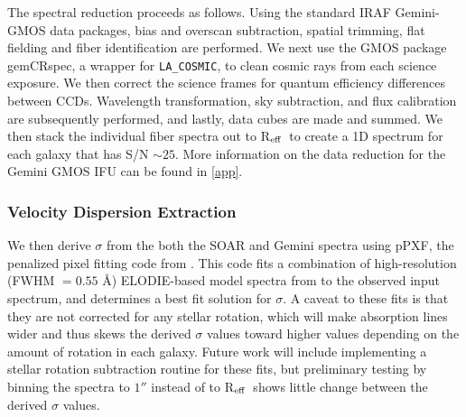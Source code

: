 \documentclass[iop,apj]{emulateapj}
\newcommand{\Reff}{R$_{\rm eff}$}
\begin{document}
The spectral reduction proceeds as follows. Using the standard IRAF Gemini-GMOS data packages, bias and overscan subtraction, spatial trimming, flat fielding and fiber identification are performed. We next use the GMOS package gemCRspec, a wrapper for \texttt{LA\_COSMIC}, to clean cosmic rays from each science exposure. We then correct the science frames for quantum efficiency differences between CCDs. Wavelength transformation, sky subtraction, and flux calibration are subsequently performed, and lastly, data cubes are made and summed. We then stack the individual fiber spectra out to \Reff\ to create a 1D spectrum for each galaxy that has S/N $\sim25$. More information on the data reduction for the Gemini GMOS IFU can be found in \autoref{app}.

\subsubsection{Velocity Dispersion Extraction}

\noindent We then derive $\sigma$ from the both the SOAR and Gemini spectra using {\sc pPXF}, the penalized pixel fitting code from \citet{Cappellari2004}. This code fits a combination of high-resolution (FWHM $= 0.55$ \AA) ELODIE-based model spectra from \citet{Maraston2011} to the observed input spectrum, and determines a best fit solution for $\sigma$. A caveat to these fits is that they are not corrected for any stellar rotation, which will make absorption lines wider and thus skews the derived $\sigma$ values toward higher values depending on the amount of rotation in each galaxy. Future work will include implementing a stellar rotation subtraction routine for these fits, but preliminary testing by binning the spectra to $1''$ instead of to \Reff\ shows little change between the derived $\sigma$ values.
\end{document}
